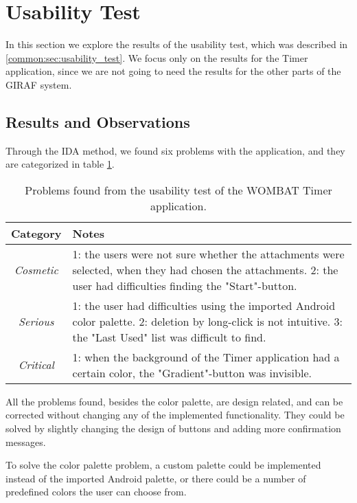 \section{Usability Test}
\label{sec:usability_results}

In this section we explore the results of the usability test, which was described in \autoref{common:sec:usability_test}. We focus only on the results for the Timer application, since we are not going to need the results for the other parts of the GIRAF system.

\subsection{Results and Observations}
Through the IDA method, we found six problems with the application, and they are categorized in table \ref{IDA_table}.

\begin{table}[width=\textwidth][H]
		\begin{center}
			\begin{tabular}{|c|p{10cm}|}
				\hline
				\textbf{Category} & \textbf{Notes} \\
				\hline
				\textit{Cosmetic} & 1: the users were not sure whether the attachments were selected, when they had chosen the attachments. 2: the user had difficulties finding the "Start"-button. \\
				\hline
				\textit{Serious} & 1: the user had difficulties using the imported Android color palette. 2: deletion by long-click is not intuitive. 3: the "Last Used" list was difficult to find. \\
				\hline
				\textit{Critical} & 1: when the background of the Timer application had a certain color, the "Gradient"-button was invisible. \\
				\hline
			\end{tabular}
			\caption{Problems found from the usability test of the WOMBAT Timer application.}
			\label{IDA_table}
		\end{center}
	\end{table}
	
All the problems found, besides the color palette, are design related, and can be corrected without changing any of the implemented functionality. They could be solved by slightly changing the design of buttons and adding more confirmation messages. 
	
To solve the color palette problem, a custom palette could be implemented instead of the imported Android palette, or there could be a number of predefined colors the user can choose from.